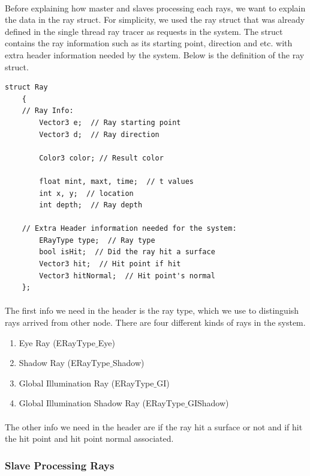\documentclass[a4paper, oneside, 10pt]{article}
\begin{document}
\paragraph{} Before explaining how master and slaves processing each rays, we want to explain the data in the ray struct.  For simplicity, we used the ray struct that was already defined in the single thread ray tracer as requests in the system.  The struct contains the ray information such as its starting point, direction and etc. with extra header information needed by the system.  Below is the definition of the ray struct.
\lstset{language=C++} 
\begin{lstlisting}[frame=single] 
struct Ray
    {
    // Ray Info:
        Vector3 e;  // Ray starting point
        Vector3 d;  // Ray direction
 
        Color3 color; // Result color
        
        float mint, maxt, time;  // t values
        int x, y;  // location
        int depth;  // Ray depth
        
    // Extra Header information needed for the system:
        ERayType type;  // Ray type
        bool isHit;  // Did the ray hit a surface
        Vector3 hit;  // Hit point if hit
        Vector3 hitNormal;  // Hit point's normal
    }; 
\end{lstlisting}
\paragraph{} The first info we need in the header is the ray type, which we use to distinguish rays arrived from other node. There are four different kinds of rays in the system.
\begin{enumerate}
\item Eye Ray (ERayType$\_$Eye)
\item Shadow Ray (ERayType$\_$Shadow)
\item Global Illumination Ray (ERayType$\_$GI)
\item Global Illumination Shadow Ray (ERayType$\_$GIShadow)
\end{enumerate}
\paragraph{} The other info we need in the header are if the ray hit a surface or not and if hit the hit point and hit point normal associated.\\ 
\subsubsection{Slave Processing Rays}
\end{document}
